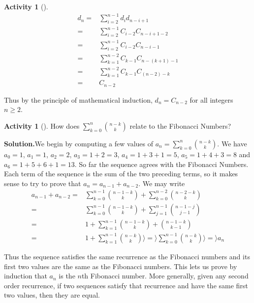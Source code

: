 \documentclass[10pt,]{book}
\theoremstyle{plain}
\theoremstyle{definition}
\newtheorem{activity}[project]{Activity}
\numberwithin{equation}{chapter}
\newcommand{\amp}{&}
\begin{document}
\begin{activity}[]
\begin{align*}
d_n =\amp \sum\limits_{i=2}^{n-1} d_id_{n-i+1}\\
=\amp \sum\limits_{i=2}^{n-1} C_{i-2}C_{n-i+1-2}\\
=\amp \sum\limits_{i=2}^{n-1} C_{i-2}C_{n-i-1}\\
=\amp \sum\limits_{k=1}^{n-2} C_{k-1}C_{n-(k+1)-1}\\
=\amp \sum\limits_{k=1}^{n-2} C_{k-1}C_{(n-2)-k}\\
=\amp C_{n-2}
\end{align*}
%
\par
Thus by the principle of mathematical induction, \(d_n=C_{n-2}\) for all integers \(n\ge 2\).%
\end{activity}
\begin{activity}[]\label{activity-201}
How does \(\sum_{k=0}^n\binom{n-k}{k}\) relate to the Fibonacci Numbers?%
\par\medskip\noindent%
\textbf{Solution.}\quad We begin by computing a few values of \(a_n=\sum_{k=0}^n\binom{n-k}{k}\). We have \(a_0=1\), \(a_1=1\), \(a_2=2\), \(a_3=1+2=3\), \(a_4=1+3+1=5\), \(a_5=1+4+3=8\) and \(a_6=1+5+6+1=13\). So far the sequence agrees with the Fibonacci Numbers. Each term of the sequence is the sum of the two preceding terms, so it makes sense to try to prove that \(a_n=a_{n-1}+a_{n-2}\). We may write%
\begin{align*}
a_{n-1}+a_{n-2}
=\amp \sum_{k=0}^{n-1} \binom{n-1-k}{k}
+\sum_{k=0}^{n-2} \binom{n-2-k}{k}\\
=\amp \sum_{k=0}^{n-1} \binom{n-1-k}{k}+\sum_{j=1}^{n-1}\binom{n-1-j}{j-1}\\
=\amp 1+\sum_{k=1}^{n-1}\binom{n-1-k}{k}+\binom{n-1-k}{k-1}\\
=\amp 1+\sum_{k=1}^{n-1}\binom{n-k}{k} \rangle =\rangle  \sum_{k=0}^{n-1}\binom{n-k}{k}
\rangle =\rangle  a_n
\end{align*}
%
\par
Thus the sequence satisfies the same recurrence as the Fibonacci numbers and its first two values are the same as the Fibonacci numbers. This lets us prove by induction that \(a_n\) is the \(n\)th Fibonacci number. More generally, given any second order recurrence, if two sequences satisfy that recurrence and have the same first two values, then they are equal.%
\end{activity}
\end{document}
